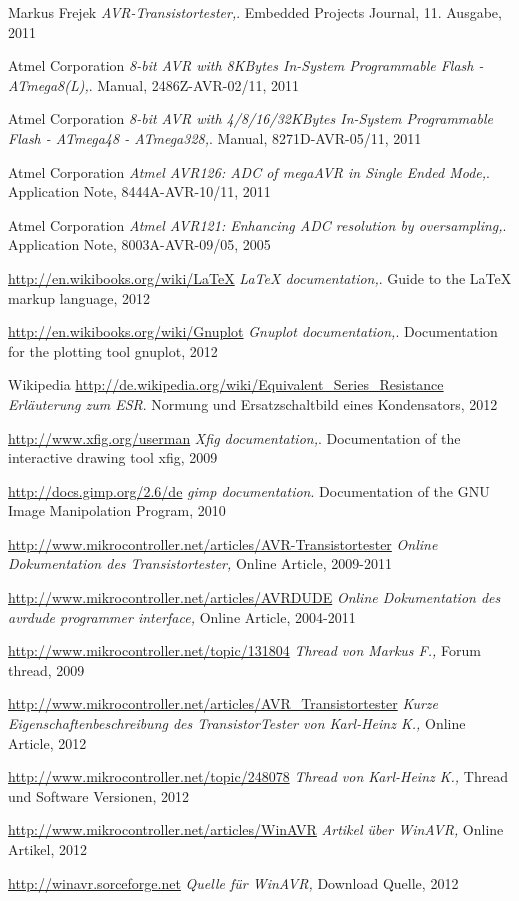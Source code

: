 \documentclass[pdftex,12pt,a4paper,oneside,english]{report}
\begin{document}
\begin{thebibliography}{99}

Markus Frejek
\emph{AVR-Transistortester,}.
Embedded Projects Journal,
11. Ausgabe,
2011

Atmel Corporation
\emph{8-bit AVR with 8KBytes In-System Programmable Flash - ATmega8(L),}.
Manual,
2486Z-AVR-02/11,
2011

Atmel Corporation
\emph{8-bit AVR with 4/8/16/32KBytes In-System Programmable Flash - ATmega48 - ATmega328,}.
Manual,
8271D-AVR-05/11,
2011

Atmel Corporation
\emph{Atmel AVR126: ADC of megaAVR in Single Ended Mode,}.
Application Note,
8444A-AVR-10/11,
2011

Atmel Corporation
\emph{Atmel AVR121: Enhancing ADC resolution by oversampling,}.
Application Note,
8003A-AVR-09/05,
2005

\url{http://en.wikibooks.org/wiki/LaTeX}
\emph{LaTeX documentation,}.
Guide to the LaTeX markup language,
2012

\url{http://en.wikibooks.org/wiki/Gnuplot}
\emph{Gnuplot documentation,}.
Documentation for the plotting tool gnuplot,
2012

Wikipedia
\url{http://de.wikipedia.org/wiki/Equivalent_Series_Resistance}
\emph{Erläuterung zum ESR}.
Normung und Ersatzschaltbild eines Kondensators,
2012

\url{http://www.xfig.org/userman}
\emph{Xfig documentation,}.
Documentation of the interactive drawing tool xfig,
2009

\url{http://docs.gimp.org/2.6/de}
\emph{gimp documentation}.
Documentation of the GNU Image Manipolation Program,
2010

\url{http://www.mikrocontroller.net/articles/AVR-Transistortester}
\emph{Online Dokumentation des Transistortester,}
Online Article,
2009-2011

\url{http://www.mikrocontroller.net/articles/AVRDUDE}
\emph{Online Dokumentation des avrdude programmer interface,}
Online Article,
2004-2011

\url{http://www.mikrocontroller.net/topic/131804}
\emph{Thread von Markus F.,}
Forum thread, 
2009

\url{http://www.mikrocontroller.net/articles/AVR\_Transistortester}
\emph{Kurze Eigenschaftenbeschreibung des TransistorTester von Karl-Heinz K.,}
Online Article,
2012

\url{http://www.mikrocontroller.net/topic/248078}
\emph{Thread von Karl-Heinz K.,}
Thread und Software Versionen,
2012

\url{http://www.mikrocontroller.net/articles/WinAVR}
\emph{Artikel über WinAVR,}
Online Artikel,
2012

\url{http://winavr.sorceforge.net}
\emph{Quelle für WinAVR,}
Download Quelle,
2012


\end{thebibliography}
\end{document}
